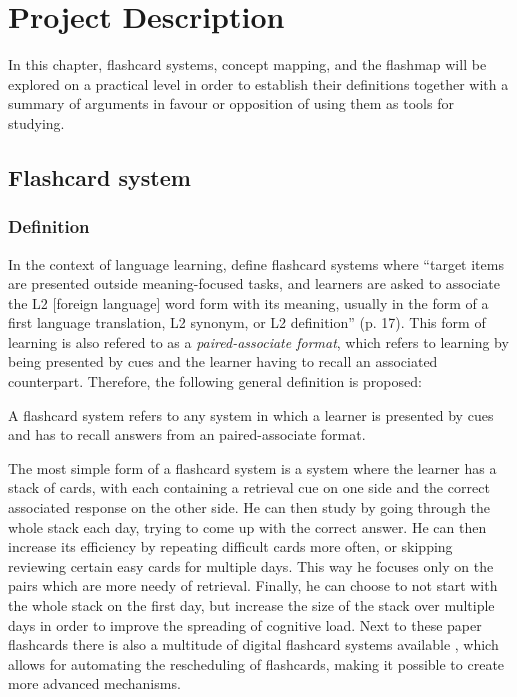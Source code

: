 \chapter{Project Description}

In this chapter, flashcard systems, concept mapping, and the flashmap will be explored on a practical level in order to establish their definitions together with a summary of arguments in favour or opposition of using them as tools for studying.

\section{Flashcard system}

\subsection{Definition}

In the context of language learning,  define flashcard systems where ``target items are presented outside meaning-focused tasks, and learners are asked to associate the L2 [foreign language] word form with its meaning, usually in the form of a first language translation, L2 synonym, or L2 definition'' (p. 17). This form of learning is also refered to as a \emph{paired-associate format}, which refers to learning by being presented by cues and the learner having to recall an associated counterpart. Therefore, the following general definition is proposed:

\begin{definition}
A flashcard system refers to any system in which a learner is presented by cues and has to recall answers from an paired-associate format.
\end{definition}

The most simple form of a flashcard system is a system where the learner has a stack of cards, with each containing a retrieval cue on one side and the correct associated response on the other side. He can then study by going through the whole stack each day, trying to come up with the correct answer. He can then increase its efficiency by repeating difficult cards more often, or skipping reviewing certain easy cards for multiple days. This way he focuses only on the pairs which are more needy of retrieval. Finally, he can choose to not start with the whole stack on the first day, but increase the size of the stack over multiple days in order to improve the spreading of cognitive load. Next to these paper flashcards there is also a multitude of digital flashcard systems available \cite{hwang2, nakata, microlearning}, which allows for automating the rescheduling of flashcards, making it possible to create more advanced mechanisms.


